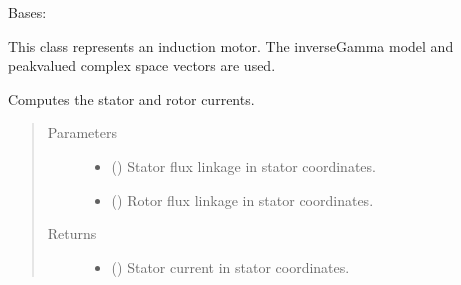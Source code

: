 \documentclass[letterpaper,10pt,english]{sphinxmanual}
\begin{document}

\begin{fulllineitems}
\label{\detokenize{model:model.im_drive.Motor}}
\pysigstartsignatures
{}
\pysigstopsignatures
\sphinxAtStartPar
Bases: 

\sphinxAtStartPar
This class represents an induction motor. The inverse\sphinxhyphen{}Gamma model and
peak\sphinxhyphen{}valued complex space vectors are used.

\begin{fulllineitems}
\label{\detokenize{model:model.im_drive.Motor.currents}}
\pysigstartsignatures
{}
\pysigstopsignatures
\sphinxAtStartPar
Computes the stator and rotor currents.
\begin{quote}\begin{description}
\item[{Parameters}] \leavevmode\begin{itemize}
\item {} 
\sphinxAtStartPar
{} () \textendash{} Stator flux linkage in stator coordinates.

\item {} 
\sphinxAtStartPar
{} () \textendash{} Rotor flux linkage in stator coordinates.

\end{itemize}

\item[{Returns}] \leavevmode
\sphinxAtStartPar
\begin{itemize}
\item {} 
\sphinxAtStartPar
{} () \textendash{} Stator current in stator coordinates.


\end{itemize}
\end{description}
\end{quote}
\end{fulllineitems}
\end{fulllineitems}
\end{document}
